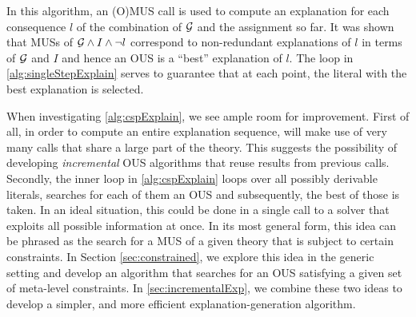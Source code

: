 In this algorithm, an (O)MUS call is used to compute an explanation for each consequence $l$ of the combination of $\mathcal{G} $ and the assignment so far. 
It was shown that MUSs of $\mathcal{G} \land I\land\lnot l$ correspond to non-redundant explanations of $l$ in terms of $\mathcal{G} $ and $I$ and hence an OUS is a ``best'' explanation of $l$. 
The loop in \cref{alg:singleStepExplain} serves to guarantee that at each point, the literal with the best explanation is selected. 





When investigating \cref{alg:cspExplain}, we see ample room for improvement. 
First of all, in order to compute an entire explanation sequence, \label{alg:cspExplain} will make use of very many \omus calls that share a large part of the theory. 
This suggests the possibility of developing \emph{incremental} OUS algorithms that reuse results from previous calls. 
Secondly, the inner loop in \cref{alg:cspExplain} loops over all possibly derivable  literals, searches for each of them an OUS and subsequently, the best of those is taken. 
In an ideal situation, this could be done in a single call to a solver that exploits all possible information at once. 
In its most general form, this idea can be phrased as the search for a MUS of a given theory that is subject to certain constraints. 
In Section \ref{sec:constrained}, we explore this idea in the generic setting and develop an algorithm that searches for an OUS satisfying a given set of meta-level constraints. 
In \cref{sec:incrementalExp}, we combine these two ideas to develop a simpler, and more efficient explanation-generation algorithm. 
